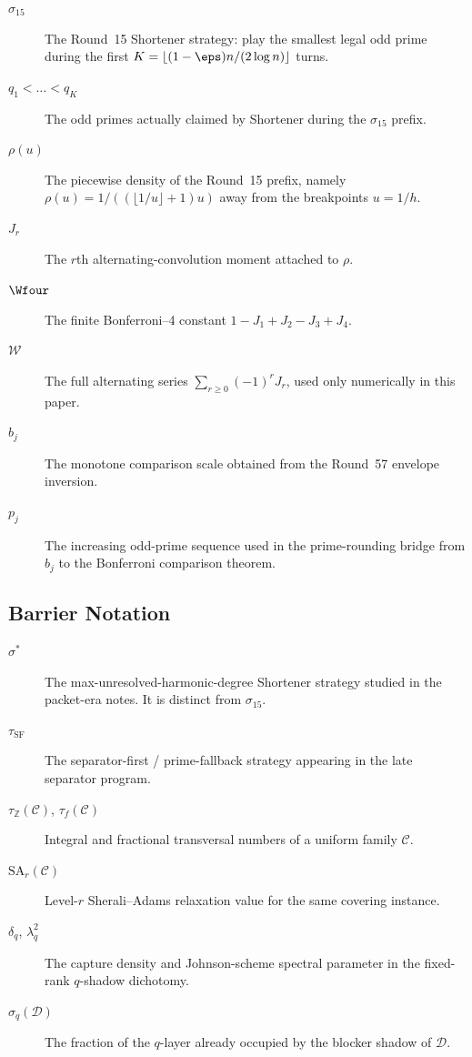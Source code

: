 \begin{description}
  \item[$\sigma_{15}$] The Round~15 Shortener strategy: play the smallest legal
  odd prime during the first
  $K=\lfloor (1-\eps)n/(2\log n)\rfloor$ turns.
  \item[$q_1<\dots<q_K$] The odd primes actually claimed by Shortener during the
  $\sigma_{15}$ prefix.
  \item[$\rho(u)$] The piecewise density of the Round~15 prefix, namely
  $\rho(u)=1/((\lfloor 1/u\rfloor+1)u)$ away from the breakpoints $u=1/h$.
  \item[$J_r$] The $r$th alternating-convolution moment attached to $\rho$.
  \item[$\Wfour$] The finite Bonferroni--4 constant
  $1-J_1+J_2-J_3+J_4$.
  \item[$\mathcal W$] The full alternating series
  $\sum_{r\ge 0}(-1)^rJ_r$, used only numerically in this paper.
  \item[$b_j$] The monotone comparison scale obtained from the Round~57 envelope
  inversion.
  \item[$p_j$] The increasing odd-prime sequence used in the prime-rounding
  bridge from $b_j$ to the Bonferroni comparison theorem.
\end{description}

\subsection{Barrier Notation}

\begin{description}
  \item[$\sigma^*$] The max-unresolved-harmonic-degree Shortener strategy
  studied in the packet-era notes.  It is distinct from $\sigma_{15}$.
  \item[$\tau_{\mathrm{SF}}$] The separator-first / prime-fallback strategy
  appearing in the late separator program.
  \item[$\tau_{\mathbb Z}(\mathcal C)$, $\tau_f(\mathcal C)$] Integral and
  fractional transversal numbers of a uniform family $\mathcal C$.
  \item[$\mathrm{SA}_r(\mathcal C)$] Level-$r$ Sherali--Adams relaxation value
  for the same covering instance.
  \item[$\delta_q$, $\lambda_q^2$] The capture density and Johnson-scheme
  spectral parameter in the fixed-rank $q$-shadow dichotomy.
  \item[$\sigma_q(\mathcal D)$] The fraction of the $q$-layer already occupied
  by the blocker shadow of $\mathcal D$.
\end{description}
